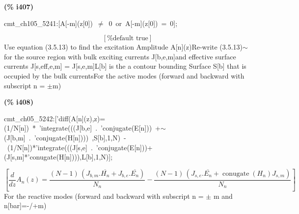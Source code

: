 \documentclass[fleqn]{article}
\begin{document}
\noindent
\begin{minipage}[t]{4.000000em}\color{red}\bfseries
(\% i407)	
\end{minipage}
\begin{minipage}[t]{\textwidth}\color{blue}
cmt\_ch105\_5241:[A[-m](z[0])\ \ensuremath{\neq}\ 0\ or\ A[-m](z[0])\ =\ 0];
\end{minipage}
\[\displaystyle \tag{\% o407} 
\left[ \mbox{%
true}\right] \mbox{}
\]
Use equation (3.5.13) to find the excitation Amplitude A[n](z)Re-write (3.5.13)\ensuremath{\sim }for the source region with bulk exciting currents J[b,e,m]and effective surface currents J[s,eff,e,m]  = J[s,e,m]L[b] is the a contour bounding Surface S[b] that is occupied by the bulk currentsFor the active modes (forward and backward with subscript n = \ensuremath{\pm}m)


\noindent
\begin{minipage}[t]{4.000000em}\color{red}\bfseries
(\% i408)	
\end{minipage}
\begin{minipage}[t]{\textwidth}\color{blue}
cmt\_ch05\_5242:['diff(A[n](z),z)=(1/N[n])\ *\ 'integrate(((J[b,e]\ .\ 'conjugate(E[n]))\ +\ensuremath{\sim\ }(J[b,m]\ .\ 'conjugate(H[n])))\ ,S[b],1,N)\ -\ (1/N[n])*'integrate(((J[s,e]\ .\ 'conjugate(E[n]))+(J[s,m]*'conugate(H[n]))),L[b],1,N)];
\end{minipage}
\[\displaystyle \tag{\% o408} 
\operatorname{[}\frac{d}{d z} {A_n}(z)=\frac{\left( N-1\right) \, \left( {J_{b,m}}\ensuremath{\mathrm{ . }}\overline{{H_n}}+{J_{b,e}}\ensuremath{\mathrm{ . }}\overline{{E_n}}\right) }{{N_n}}-
\frac{\left( N-1\right) \, \left( {J_{s,e}}\ensuremath{\mathrm{ . }}\overline{{E_n}}+\operatorname{conugate}\left( {H_n}\right)  {J_{s,m}}\right) }{{N_n}}\operatorname{]}\mbox{}
\]
For the reactive modes (forward and backward with subscript n = \ensuremath{\pm} m and n[bar]=-/+m)
\end{document}
